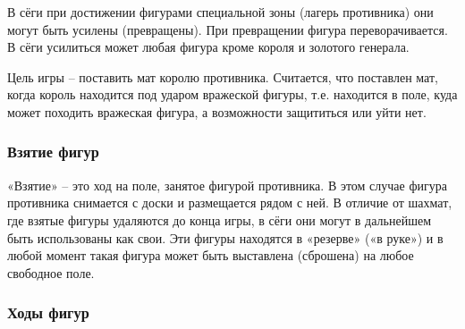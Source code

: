 В сёги при достижении фигурами специальной зоны (лагерь противника) они могут быть усилены (превращены). При превращении фигура переворачивается. В сёги усилиться может любая фигура кроме короля и золотого генерала.

Цель игры – поставить мат королю противника. Считается, что поставлен мат, когда король находится под ударом вражеской фигуры, т.е. находится в поле, куда может походить вражеская фигура, а возможности защититься или уйти нет.

\subsubsection{Взятие фигур}

«Взятие» – это ход на поле, занятое фигурой противника. В этом случае фигура противника снимается с доски и размещается рядом с ней. В отличие от шахмат, где взятые фигуры удаляются до конца игры, в сёги они могут в дальнейшем быть использованы как свои. Эти фигуры находятся в «резерве» («в руке») и в любой момент такая фигура может быть выставлена (сброшена) на любое свободное поле. 

\subsubsection{Ходы фигур}

